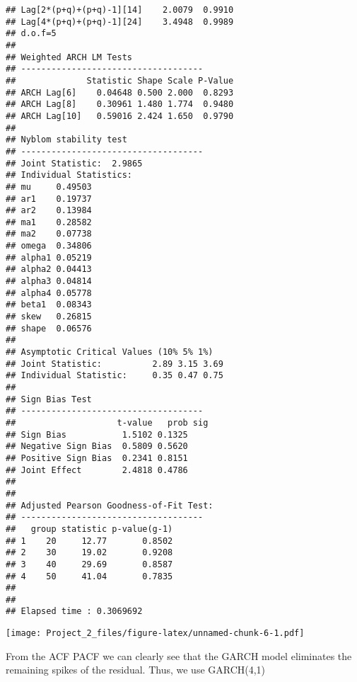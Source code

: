 \documentclass[]{article}
\newenvironment{Shaded}{\begin{snugshade}}{\end{snugshade}}
\newcommand{\KeywordTok}[1]{\textcolor[rgb]{0.13,0.29,0.53}{\textbf{#1}}}
\newcommand{\DataTypeTok}[1]{\textcolor[rgb]{0.13,0.29,0.53}{#1}}
\newcommand{\StringTok}[1]{\textcolor[rgb]{0.31,0.60,0.02}{#1}}
\newcommand{\CommentTok}[1]{\textcolor[rgb]{0.56,0.35,0.01}{\textit{#1}}}
\newcommand{\OperatorTok}[1]{\textcolor[rgb]{0.81,0.36,0.00}{\textbf{#1}}}
\newcommand{\NormalTok}[1]{#1}
\begin{document}
\begin{verbatim}
## Lag[2*(p+q)+(p+q)-1][14]    2.0079  0.9910
## Lag[4*(p+q)+(p+q)-1][24]    3.4948  0.9989
## d.o.f=5
## 
## Weighted ARCH LM Tests
## ------------------------------------
##              Statistic Shape Scale P-Value
## ARCH Lag[6]    0.04648 0.500 2.000  0.8293
## ARCH Lag[8]    0.30961 1.480 1.774  0.9480
## ARCH Lag[10]   0.59016 2.424 1.650  0.9790
## 
## Nyblom stability test
## ------------------------------------
## Joint Statistic:  2.9865
## Individual Statistics:              
## mu     0.49503
## ar1    0.19737
## ar2    0.13984
## ma1    0.28582
## ma2    0.07738
## omega  0.34806
## alpha1 0.05219
## alpha2 0.04413
## alpha3 0.04814
## alpha4 0.05778
## beta1  0.08343
## skew   0.26815
## shape  0.06576
## 
## Asymptotic Critical Values (10% 5% 1%)
## Joint Statistic:          2.89 3.15 3.69
## Individual Statistic:     0.35 0.47 0.75
## 
## Sign Bias Test
## ------------------------------------
##                    t-value   prob sig
## Sign Bias           1.5102 0.1325    
## Negative Sign Bias  0.5809 0.5620    
## Positive Sign Bias  0.2341 0.8151    
## Joint Effect        2.4818 0.4786    
## 
## 
## Adjusted Pearson Goodness-of-Fit Test:
## ------------------------------------
##   group statistic p-value(g-1)
## 1    20     12.77       0.8502
## 2    30     19.02       0.9208
## 3    40     29.69       0.8587
## 4    50     41.04       0.7835
## 
## 
## Elapsed time : 0.3069692
\end{verbatim}

\begin{Shaded}
\end{Shaded}

\texttt{[image: Project\_2\_files/figure-latex/unnamed-chunk-6-1.pdf]}

From the ACF PACF we can clearly see that the GARCH model eliminates the
remaining spikes of the residual. Thus, we use GARCH(4,1)
\end{document}

